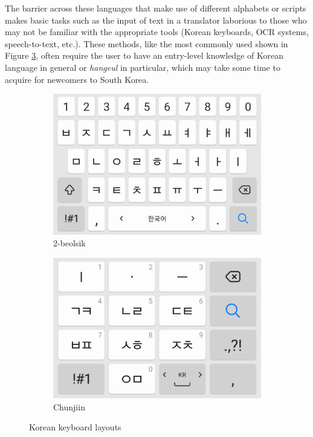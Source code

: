 The barrier across these languages that make use of different alphabets or scripts makes basic tasks such as the input of text in a translator laborious to those who may not be familiar with the appropriate tools (Korean keyboards, OCR systems, speech-to-text, etc.). These methods, like the most commonly used shown in Figure \ref{fig:keyboard}, often require the user to have an entry-level knowledge of Korean language in general or \textit{hangeul} in particular, which may take some time to acquire for newcomers to South Korea.

\begin{figure}[h]
    \begin{subfigure}{0.5\textwidth}
        \centering
        \includegraphics[width=0.9\linewidth]{Figures/2beolsik.jpg} 
        \caption{2-beolsik}
        \label{fig:2beolsik}
    \end{subfigure}
    \begin{subfigure}{0.5\textwidth}
        \centering
        \includegraphics[width=0.9\linewidth]{Figures/chunjiin.jpg}
        \caption{Chunjiin}
        \label{fig:chunjiin}
    \end{subfigure}
    \caption{Korean keyboard layouts}
    \label{fig:keyboard}
\end{figure}

